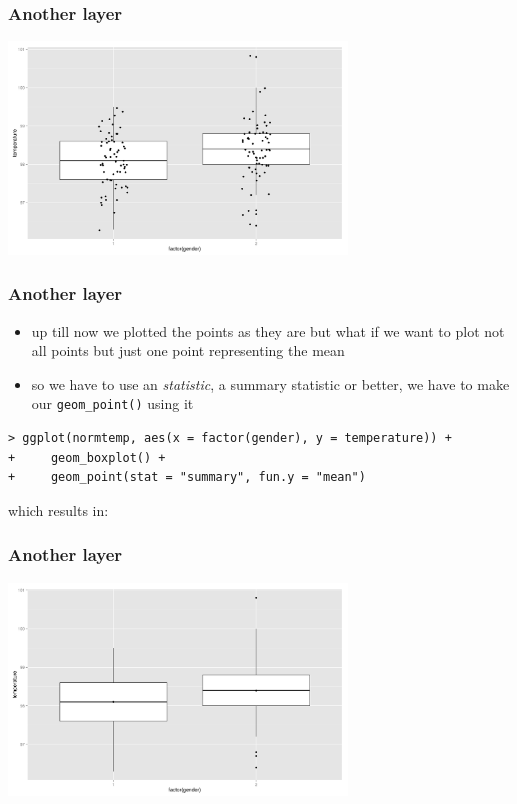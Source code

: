 \documentclass[xcolor={table}]{beamer}
\begin{document}
\begin{frame}\frametitle{Another layer}
  \begin{center}
    \includegraphics[width=9cm]{boxplotjitter2.png}
  \end{center}
\end{frame}


\begin{frame}[fragile]\frametitle{Another layer}
  \begin{itemize}
  \item up till now we plotted the points as they are but what if we want to plot not all points but just one point representing the mean
  \item so we have to use an \textit{statistic}, a summary statistic or better, we have to make our \texttt{geom\_point()} using it
  \end{itemize}\small
\begin{verbatim}
> ggplot(normtemp, aes(x = factor(gender), y = temperature)) +
+     geom_boxplot() +
+     geom_point(stat = "summary", fun.y = "mean")
\end{verbatim}
which results in:
\end{frame}

\begin{frame}\frametitle{Another layer}
  \begin{center}
    \includegraphics[width=9cm]{boxplotmean.png}
  \end{center}
\end{frame}
\end{document}
